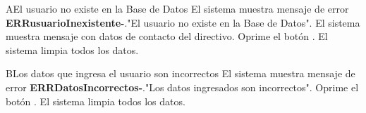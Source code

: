 	\begin{UCtrayectoriaA}{A}{El usuario no existe en la Base de Datos}
			\UCpaso El sistema muestra mensaje de error {\bf ERRusuarioInexistente-}."El usuario no existe en la Base de Datos".
			\UCpaso El sistema muestra mensaje con datos de contacto del directivo.
			\UCpaso[\UCactor]Oprime el botón .
			\UCpaso El sistema limpia todos los datos. 
		\end{UCtrayectoriaA}
	
	\begin{UCtrayectoriaA}{B}{Los datos que ingresa el usuario son incorrectos}
			\UCpaso El sistema muestra mensaje de error {\bf ERRDatosIncorrectos-}."Los datos ingresados son incorrectos".
			\UCpaso[\UCactor]Oprime el botón .
			\UCpaso El sistema limpia todos los datos. 
		\end{UCtrayectoriaA}
		
		
